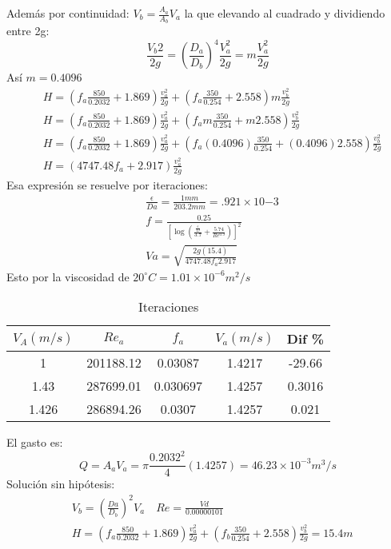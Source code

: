 Además por continuidad: $V_b= \frac{A_a}{A_b}V_a$ la que elevando al cuadrado y dividiendo entre 2g:
\begin{equation*}
    \frac{V_b2}{2g} = \left(\frac{D_a}{D_b}\right)^4\frac{V_a^2}{2g} = m\frac{V_a^2}{2g}
\end{equation*}
Así $m=0.4096$
\begin{align*}
    &H =\left(f_a\frac{850}{0.2032} + 1.869\right) \frac{v_a^2}{2g} +\left(f_a\frac{350}{0.254} + 2.558\right) m\frac{v_b^2}{2g}\\
    &H =\left(f_a\frac{850}{0.2032} + 1.869\right) \frac{v_a^2}{2g} +\left(f_am\frac{350}{0.254} + m2.558\right) \frac{v_b^2}{2g}\\
    &H =\left(f_a\frac{850}{0.2032} + 1.869\right) \frac{v_a^2}{2g} +\left(f_a(0.4096)\frac{350}{0.254} + (0.4096)2.558\right) \frac{v_b^2}{2g}\\
    &H =\left(4747.48 f_a + 2.917\right) \frac{v_a^2}{2g}
\end{align*}
Esa expresión se resuelve por iteraciones:
\begin{align*}
    &\frac{\epsilon}{Da} = \frac{1mm}{203.2mm} = .921 \times 10{ - 3}\\
    &f = \frac{0.25}{\left[ \log{\left(\frac{\frac{\epsilon}{D}}{3.7} +\frac{5.74}{Re^{0.9}}\right)}\right]^2}\\
    &Va= \sqrt{\frac{2g(15.4)}{4747.48f_a 2.917}}
\end{align*}
Esto por la viscosidad de $20^{\circ}C=1.01 \times 10^{-6} m^2/s$
\begin{table}[h!]
    \centering
    \begin{tabular}{@{}ccccc@{}}
    \toprule
    $V_A(m/s)$ & $Re_a$    & $f_a$    & $V_a(m/s)$ & Dif \% \\ \midrule
    1          & 201188.12 & 0.03087  & 1.4217     & -29.66 \\
    1.43       & 287699.01 & 0.030697 & 1.4257     & 0.3016 \\
    1.426      & 286894.26 & 0.0307   & 1.4257     & 0.021  \\ \bottomrule
    \end{tabular}
    \caption{Iteraciones}
    \label{tabhb28}
\end{table}
El gasto es:
\begin{equation*}
    Q = A_a V_a = \pi\frac{0.2032^2}{4}(1.4257) = 46.23 \times 10^{ -3}m^3/s
\end{equation*}
Solución sin hipótesis:
\begin{align*}
    &V_b =\left(\frac{Da}{D_b}\right)^2 V_a\quad Re = \frac{Vd}{0.00000101}\\
    &H =\left(f_a\frac{850}{0.2032} + 1.869\right) \frac{v_a^2}{2g} +\left(f_b\frac{350}{0.254} + 2.558\right) \frac{v_b^2}{2g} =15.4m
\end{align*}
